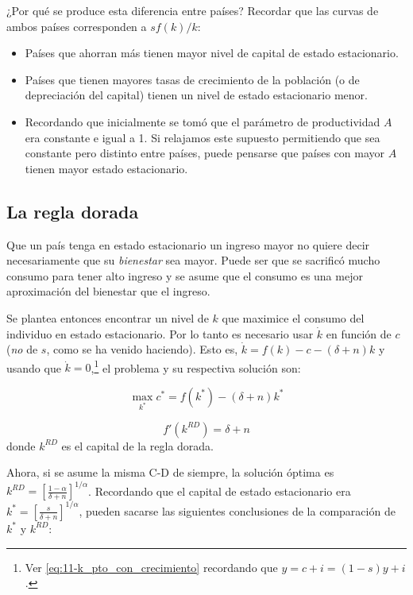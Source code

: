 \documentclass[DeGregorioResumen]{subfiles}
\begin{document}
¿Por qué se produce esta diferencia entre países? Recordar que las curvas de ambos países corresponden a $sf(k)/k$:

\begin{itemize}
\item Países que ahorran más tienen mayor nivel de capital de estado estacionario.
\item Países que tienen mayores tasas de crecimiento de la población (o de depreciación del capital) tienen un nivel de estado estacionario menor.
\item Recordando que inicialmente se tomó que el parámetro de productividad $A$ era constante e igual a 1. Si relajamos este supuesto permitiendo que sea constante pero distinto entre países, puede pensarse que países con mayor $A$ tienen mayor estado estacionario.
\end{itemize}

\subsection{La regla dorada}

Que un país tenga en estado estacionario un ingreso mayor no quiere decir necesariamente que su \emph{bienestar} sea mayor. Puede ser que se sacrificó mucho consumo para tener alto ingreso y se asume que el consumo es una mejor aproximación del bienestar que el ingreso.

Se plantea entonces encontrar un nivel de $k$ que maximice el consumo del individuo en estado estacionario. Por lo tanto es necesario usar $\dot k$ en función de $c$ (\emph{no} de $s$, como se ha venido haciendo). Esto es, $\dot k = f(k)-c-(\delta +n)k$ y usando que $\dot k=0$,\footnote{Ver \eqref{eq:11-k_pto_con_crecimiento} recordando que $y=c+i=(1-s)y+i$.} el problema y su respectiva solución son:

\begin{equation*}
\max_{k^*}c^* = f(k^*)-(\delta + n)k^*
\end{equation*}

\begin{equation}
f'(k^{RD})=\delta + n
\end{equation}
donde $k^{RD}$ es el capital de la regla dorada.

Ahora, si se asume la misma C-D de siempre, la solución óptima es $\displaystyle k^{RD}=\left[\frac{1-\alpha}{\delta + n} \right]^{1/\alpha} $. Recordando que el capital de estado estacionario era $\displaystyle k^*=\left[\frac{s}{\delta + n} \right]^{1/\alpha} $, pueden sacarse las siguientes conclusiones de la comparación de $k^*$ y $k^{RD}$:
\end{document}
